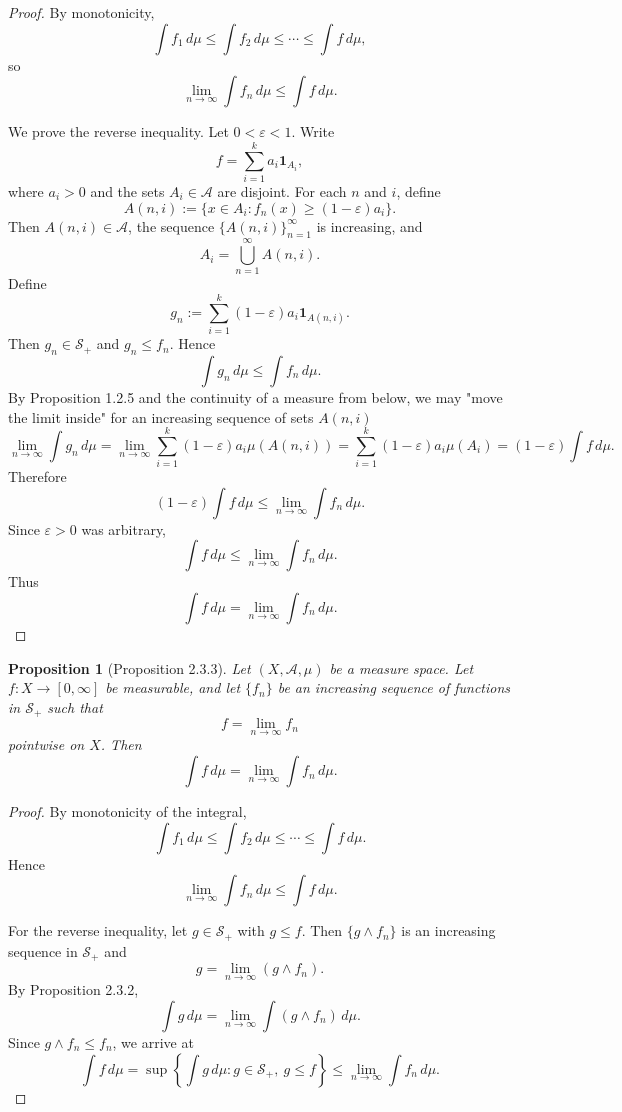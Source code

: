 \documentclass[12pt]{article}
\newtheorem{proposition}{Proposition}
\begin{document}
\begin{proof}
By monotonicity,
\[
\int f_1\,d\mu \le \int f_2\,d\mu \le \cdots \le \int f\,d\mu,
\]
so
\[
\lim_{n\to\infty}\int f_n\,d\mu \le \int f\,d\mu.
\]

We prove the reverse inequality. Let $0<\varepsilon<1$. Write
\[
f=\sum_{i=1}^k a_i\mathbf{1}_{A_i},
\]
where $a_i>0$ and the sets $A_i\in\mathcal{A}$ are disjoint. For each $n$ and
$i$, define
\[
A(n,i):=\{x\in A_i : f_n(x)\ge (1-\varepsilon)a_i\}.
\]
Then $A(n,i)\in\mathcal{A}$, the sequence $\{A(n,i)\}_{n=1}^\infty$ is increasing,
and
\[
A_i=\bigcup_{n=1}^\infty A(n,i).
\]
Define
\[
g_n:=\sum_{i=1}^k (1-\varepsilon)a_i\mathbf{1}_{A(n,i)}.
\]
Then $g_n\in\mathcal{S}_+$ and $g_n\le f_n$. Hence
\[
\int g_n\,d\mu \le \int f_n\,d\mu.
\]
By Proposition 1.2.5 and the continuity of a measure from below, we may "move the limit inside" for an increasing sequence of sets $A(n,i)$
\[
\lim_{n\to\infty}\int g_n\,d\mu
=
\lim_{n\to\infty}\sum_{i=1}^k (1-\varepsilon)a_i\mu(A(n,i))
=
\sum_{i=1}^k (1-\varepsilon)a_i\mu(A_i)
=
(1-\varepsilon)\int f\,d\mu.
\]
Therefore
\[
(1-\varepsilon)\int f\,d\mu
\le
\lim_{n\to\infty}\int f_n\,d\mu.
\]
Since $\varepsilon>0$ was arbitrary,
\[
\int f\,d\mu
\le
\lim_{n\to\infty}\int f_n\,d\mu.
\]
Thus
\[
\int f\,d\mu = \lim_{n\to\infty}\int f_n\,d\mu.
\]
\end{proof}

\begin{proposition}[Proposition 2.3.3]
Let $(X,\mathcal{A},\mu)$ be a measure space. Let $f:X\to[0,\infty]$ be
measurable, and let $\{f_n\}$ be an increasing sequence of functions in
$\mathcal{S}_+$ such that
\[
f = \lim_{n\to\infty} f_n
\]
pointwise on $X$. Then
\[
\int f\,d\mu = \lim_{n\to\infty} \int f_n\,d\mu.
\]
\end{proposition}

\begin{proof}
By monotonicity of the integral,
\[
\int f_1\,d\mu \le \int f_2\,d\mu \le \cdots \le \int f\,d\mu.
\]
Hence
\[
\lim_{n\to\infty}\int f_n\,d\mu \le \int f\,d\mu.
\]

For the reverse inequality, let $g \in \mathcal{S}_+$ with $g \le f$. Then
$\{g \wedge f_n\}$ is an increasing sequence in $\mathcal{S}_+$ and
\[
g = \lim_{n\to\infty} (g \wedge f_n).
\]
By Proposition 2.3.2,
\[
\int g\,d\mu
=
\lim_{n\to\infty}\int (g \wedge f_n)\,d\mu.
\]
Since $g \wedge f_n \le f_n$, we arrive at
\[
\int f\,d\mu
=
\sup\left\{\int g\,d\mu : g\in\mathcal{S}_+,\ g\le f\right\}\le \lim_{n\to\infty}\int f_n\,d\mu.
\]
\end{proof}
\end{document}
